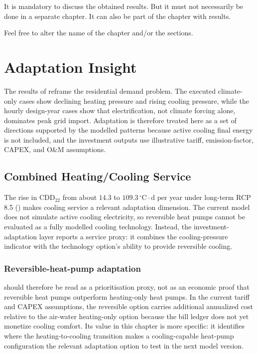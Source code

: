 \label{ch:discussion}

\begin{explanation}
    It is mandatory to discuss the obtained results. But it must not necessarily be done in a separate chapter. It can also be part of the chapter with results.
    
    Feel free to alter the name of the chapter and/or the sections.
\end{explanation}

\section{Adaptation Insight}
\label{sec:adaptationInsight}

The results of  reframe the residential demand problem. The executed climate-only cases show declining heating pressure and rising cooling pressure, while the hourly design-year cases show that electrification, not climate forcing alone, dominates peak grid import. Adaptation is therefore treated here as a set of directions supported by the modelled patterns because active cooling final energy is not included, and the investment outputs use illustrative tariff, emission-factor, CAPEX, and O\&M assumptions.


\subsection{Combined Heating/Cooling Service}
\label{sec:adaptation_reversible_hp}

The rise in CDD$_{22}$ from about $14.3$ to $109.3\,^{\circ}\mathrm{C}\cdot\mathrm{d}$ per year under long-term RCP\,8.5 () makes cooling service a relevant adaptation dimension. The current model does not simulate active cooling electricity, so reversible heat pumps cannot be evaluated as a fully modelled cooling technology. Instead, the investment-adaptation layer reports a service proxy: it combines the cooling-pressure indicator with the technology option’s ability to provide reversible cooling.

\subsubsection*{Reversible-heat-pump adaptation}
 should therefore be read as a prioritisation proxy, not as an economic proof that reversible heat pumps outperform heating-only heat pumps. In the current tariff and CAPEX assumptions, the reversible option carries additional annualized cost relative to the air-water heating-only option because the bill ledger does not yet monetize cooling comfort. Its value in this chapter is more specific: it identifies where the heating-to-cooling transition makes a cooling-capable heat-pump configuration the relevant adaptation option to test in the next model version.

